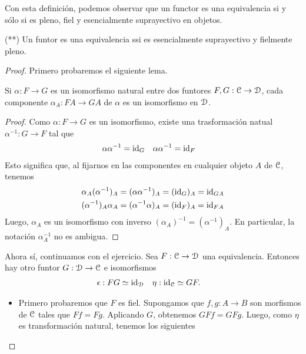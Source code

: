 Con esta definición, podemos observar que un functor es una equivalencia si y sólo si es pleno, fiel y esencialmente suprayectivo en objetos.
\begin{lemma}%
    (**) Un funtor es una equivalencia ssi es
      esencialmente suprayectivo y fielmente pleno.
\end{lemma}
\begin{proof}
    Primero probaremos el siguiente lema.
    \begin{lemma}
        Si $\alpha:F\to G$ es un isomorfismo natural entre dos funtores
        $F,G:\cal C\to\cal D$, cada componente $\alpha_A:FA\to GA$ de
        $\alpha$ es un isomorfismo en $\cal D$.
    \end{lemma}
    \begin{proof}
        Como $\alpha:F\to G$ es un isomorfismo, existe una trasformación
        natual $\alpha^{-1}:G\to F$ tal que
        \begin{align*}
            \alpha\alpha^{-1} &= \id_G
                & \alpha\alpha^{-1} &= \id_F
        \end{align*}
        Esto significa que, al fijarnos en
        las componentes en cualquier objeto $A$ de $\cal C$, tenemos
        \begin{align*}
                \alpha_A(\alpha^{-1})_A
                = (\alpha\alpha^{-1})_A
                &= (\id_G)_A
                = \id_{GA} \\
                (\alpha^{-1})_A\alpha_A
                =(\alpha^{-1}\alpha)_A
                &= (\id_{F})_A
                = \id_{FA}
        \end{align*}
        Luego, $\alpha_A$ es un isomorfismo con inverso
        $(\alpha_A)^{-1}=(\alpha^{-1})_A$.
        En particular, la notación $\alpha^{-1}_A$ no es ambigua.
    \end{proof}
    Ahora sí, continuamos con el ejercicio.
    Sea $F:\cal C \to \cal D$ una equivalencia.
    Entonces hay otro funtor $G:\cal D\to \cal C$ e isomorfismos
    \begin{align*}
        \epsilon : FG &\simeq \id_{\cal D} & \eta : \id_{\cal C} &\simeq GF.
    \end{align*}
    \begin{itemize}
        \item 
        Primero probaremos que $F$ es fiel.
        Supongamos que $f,g:A\to B$ son morfismos de $\cal C$ tales que
        $Ff = Fg$.
        Aplicando $G$, obtenemos $GFf=GFg$.
        Luego, como $\eta$ es transformación natural, tenemos los siguientes

\end{itemize}
\end{proof}
